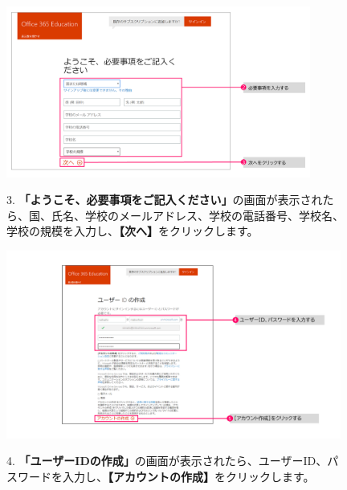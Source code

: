 \begin{figure}[h]
    \begin{minipage}{0.6\textwidth}
        \includegraphics[width=10cm]{figures/O365A1_submission02.png}
    \end{minipage}
    \begin{minipage}{0.4\textwidth}
       3. \textbf{「ようこそ、必要事項をご記入ください」}の画面が表示されたら、国、氏名、学校のメールアドレス、学校の電話番号、学校名、学校の規模を入力し、\textbf{【次へ】}をクリックします。
    \end{minipage}
\end{figure}

\begin{figure}[h]
    \begin{minipage}{0.6\textwidth}
        \hspace{-1.2cm}
        \includegraphics[width=11cm]{figures/O365A1_submission03.png}
    \end{minipage}
    \begin{minipage}{0.4\textwidth}
       4. \textbf{「ユーザーIDの作成」}の画面が表示されたら、ユーザーID、パスワードを入力し、\textbf{【アカウントの作成】}をクリックします。
    \end{minipage}
\end{figure}

